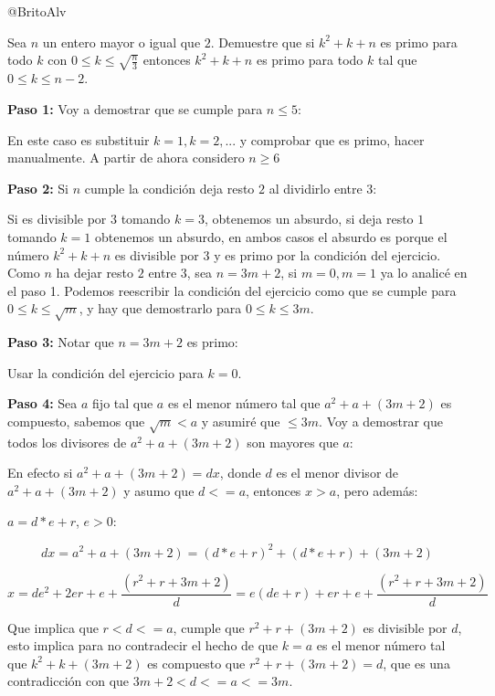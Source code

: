 \documentclass[14pt]{extarticle}
\begin{document}
@BritoAlv



\begin{tcolorbox}[colback=blue!5!white,colframe=blue!75!black, title = NO-IDEA]

Sea $n$ un entero mayor o igual que $2$. Demuestre que si $k^2+k+n$ es primo para todo $k$ con $0 \leq k \leq \sqrt{\frac{n}{3}}$ entonces $k^2+k+n$ es primo para todo $k$ tal que $0 \leq k \leq n-2$.    

\end{tcolorbox}

\textbf{Paso 1:} Voy a demostrar que se cumple para $n \leq 5$:

En este caso es substituir $k = 1, k = 2, ...$ y comprobar que es primo, hacer manualmente. A partir de ahora considero $n \geq  6$

\textbf{Paso 2:} Si $n$ cumple la condición deja resto $2$ al dividirlo entre $3$:

Si es divisible por $3$ tomando $k = 3$, obtenemos un absurdo, si deja resto $1$ tomando $k = 1$ obtenemos un absurdo, en ambos casos el absurdo es porque el número $k^2+k+n$ es divisible por $3$ y es primo por la condición del ejercicio. Como $n$ ha dejar resto $2$ entre $3$, sea $n = 3m+2$, si $m = 0, m = 1$ ya lo analicé en el paso 1. Podemos reescribir la condición del ejercicio como que se cumple para $0 \leq k \leq \sqrt{m}$, y hay que demostrarlo para $0 \leq k \leq 3m$. 

\textbf{Paso 3:} Notar que $n = 3m+2 $ es primo:

Usar la condición del ejercicio para $k = 0$.

\textbf{Paso 4:} Sea $a$ fijo tal que $a$ es el menor número tal que $a^2+a+(3m+2)$ es compuesto, sabemos que $\sqrt{m} < a$ y asumiré que $\leq 3m$. Voy a demostrar que todos los divisores de $a^2+a+(3m+2)$ son mayores que $a$:

En efecto si $a^2+a+(3m+2) = dx$, donde $d$ es el menor divisor de $a^2+a+(3m+2)$ y asumo que $d <= a$, entonces $x > a$, pero además:

$a = d*e+r$, $e > 0$:

$$dx = a^2+a+(3m+2) = (d*e+r)^2+(d*e+r) + (3m+2)$$

$$x = de^2 +2er +e + \frac{(r^2+r+3m+2)}{d} = e(de+r) + er+e + \frac{(r^2+r+3m+2)}{d}$$

Que implica que $r < d <= a$, cumple que $r^2+r+(3m+2)$ es divisible por $d$, esto implica para no contradecir el hecho de que $k = a$ es el menor número tal que $k^2+k+(3m+2)$ es compuesto que $r^2+r+(3m+2) = d$, que es una contradicción con que $3m+2< d <= a <= 3m$.
\end{document}
